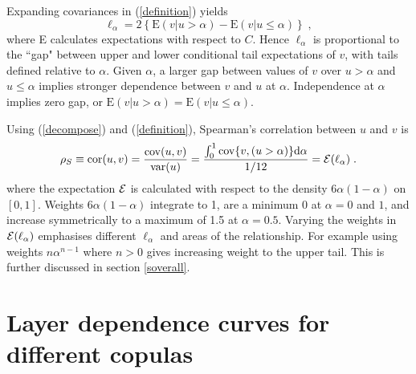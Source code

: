 \documentclass[authoryear]{elsarticle}
\newcommand{\var}{{\rm var}}
\newcommand{\cov}{{\rm cov}}
\newcommand{\E}{{\mathrm E}}
\newcommand{\Ex}{{\cal E}}
\newcommand{\cor}{\mathrm{cor}}
\newcommand{\de}{\mathrm{d}}
\newcommand{\cq}{\ ,\quad }
\newcommand{\eref}[1]{(\ref{#1})}
\newcommand{\aref}[1]{\ref{#1}}
\begin{document}
Expanding covariances in \eref{definition} yields
\begin{equation}\label{gapexp}
\ell_\alpha = 2 \left\{\E(v|u>\alpha)-\E(v|u\leq \alpha)\right\}\;,
\end{equation}
where E calculates expectations with respect to $C$. Hence $\ell_\alpha$ is proportional to the ``gap" between upper and lower conditional tail expectations of $v$, with tails defined relative to $\alpha$. Given $\alpha$, a larger gap between values of $v$ over $u>\alpha$ and $u\leq \alpha$ implies stronger dependence between $v$ and $u$ at $\alpha$. Independence at $\alpha$ implies zero gap, or $\E(v|u>\alpha)=\E(v|u\leq\alpha)$.


Using \eref{decompose} and \eref{definition}, Spearman's correlation between $u$ and $v$ is
\begin{equation}\label{wtdaverage}
\rho_S\equiv \cor(u,v) =\frac{\cov(u,v)}{\var(u)}=\frac{\int _0^1\cov\{v,(u>\alpha)\}\de\alpha}{1/12}
=\Ex(\ell_\alpha)\; .
\end{equation}
where the expectation $\Ex$ is calculated with respect to the density $6\alpha(1-\alpha)$ on $[0,1]$.
Weights $6\alpha(1-\alpha)$ integrate to 1, are a minimum $0$ at $\alpha=0$ and $1$, and increase symmetrically to  a maximum of 1.5 at $\alpha=0.5$.   Varying the weights in $\Ex(\ell_\alpha)$ emphasises different $\ell_\alpha$ and areas of the relationship.   For example using weights $n\alpha^{n-1}$ where $n>0$ gives increasing weight to the upper tail.  This is further discussed in  section \aref{soverall}.

\section{Layer dependence curves for different copulas}\label{sldcurve}
\end{document}
